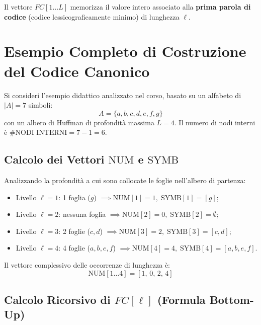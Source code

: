 \begin{definition}
Il vettore $FC[1 \dots L]$ memorizza il valore intero associato alla \textbf{prima parola di codice} (codice lessicograficamente minimo) di lunghezza $\ell$.
\end{definition}

\FloatBarrier
\section{Esempio Completo di Costruzione del Codice Canonico}
\label{sec:esempio-costruzione-canonico}

Si consideri l'esempio didattico analizzato nel corso, basato su un alfabeto di $\vert A \vert = 7$ simboli:
\begin{equation}
  A = \{a, b, c, d, e, f, g\}
\end{equation}
con un albero di Huffman di profondit\`a massima $L = 4$. Il numero di nodi interni \`e $\#\text{NODI INTERNI} = 7 - 1 = 6$.

\FloatBarrier
\subsection{Calcolo dei Vettori $\text{NUM}$ e $\text{SYMB}$}
\label{subsec:vettori-num-symb-esempio}

Analizzando la profondit\`a a cui sono collocate le foglie nell'albero di partenza:
\begin{itemize}
  \item Livello $\ell = 1$: 1 foglia ($g$) $\implies \text{NUM}[1] = 1, \; \text{SYMB}[1] = [g]$;
  \item Livello $\ell = 2$: nessuna foglia $\implies \text{NUM}[2] = 0, \; \text{SYMB}[2] = \emptyset$;
  \item Livello $\ell = 3$: 2 foglie ($c, d$) $\implies \text{NUM}[3] = 2, \; \text{SYMB}[3] = [c, d]$;
  \item Livello $\ell = 4$: 4 foglie ($a, b, e, f$) $\implies \text{NUM}[4] = 4, \; \text{SYMB}[4] = [a, b, e, f]$.
\end{itemize}

Il vettore complessivo delle occorrenze di lunghezza \`e:
\begin{equation}
  \text{NUM}[1 \dots 4] = [1, \, 0, \, 2, \, 4]
\end{equation}

\FloatBarrier
\subsection{Calcolo Ricorsivo di $FC[\ell]$ (Formula Bottom-Up)}
\label{subsec:formula-ricorsiva-fc}

